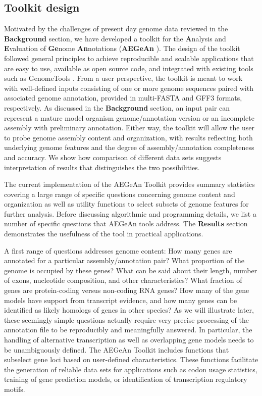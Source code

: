 \subsection{Toolkit design}
Motivated by the challenges of present day genome data reviewed in the \textbf{Background} section, we have developed a toolkit for the \textbf{A}nalysis and \textbf{E}valuation of \textbf{Ge}nome \textbf{An}notations (\textbf{AEGeAn} \cite{AEGeAn}).
The design of the toolkit followed general principles to achieve reproducible and scalable applications that are easy to use, available as open source code, and integrated with existing tools such as GenomeTools \cite{GenomeTools, GenomeToolsWebsite}.
From a user perspective, the toolkit is meant to work with well-defined inputs consisting of one or more genome sequences paired with associated genome annotation, provided in multi-FASTA and GFF3 \cite{GFF3} formats, respectively.
As discussed in the \textbf{Background} section, an input pair can represent a mature model organism genome/annotation version or an incomplete assembly with preliminary annotation.
Either way, the toolkit will allow the user to probe genome assembly content and organization, with results reflecting both underlying genome features and the degree of assembly/annotation completeness and accuracy.
We show how comparison of different data sets suggests interpretation of results that distinguishes the two possibilities.

The current implementation of the AEGeAn Toolkit provides summary statistics covering a large range of specific questions concerning genome content and organization as well as utility functions to select subsets of genome features for further analysis.
Before discussing algorithmic and programming details, we list a number of specific questions that AEGeAn tools address.
The \textbf{Results} section demonstrates the usefulness of the tool in practical applications.

A first range of questions addresses genome content:
How many genes are annotated for a particular assembly/annotation pair?
What proportion of the genome is occupied by these genes?
What can be said about their length, number of exons, nucleotide composition, and other characteristics?
What fraction of genes are protein-coding versus non-coding RNA genes?
How many of the gene models have support from transcript evidence, and how many genes can be identified as likely homologs of genes in other species?
As we will illustrate later, these seemingly simple questions actually require very precise processing of the annotation file to be reproducibly and meaningfully answered.
In particular, the handling of alternative transcription as well as overlapping gene models needs to be unambiguously defined.
The AEGeAn Toolkit includes functions that subselect gene loci based on user-defined characteristics.
These functions facilitate the generation of reliable data sets for applications such as codon usage statistics, training of gene prediction models, or identification of transcription regulatory motifs.

